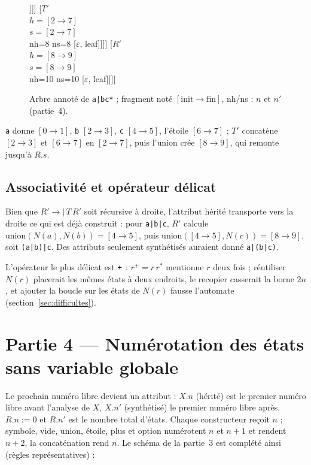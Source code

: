 \documentclass[12pt,a4paper]{article}
\newcommand{\code}[1]{{\fontsize{10}{12}\selectfont\texttt{#1}}}
\newcommand{\eps}{\ensuremath{\varepsilon}}
\newcommand{\fr}[2]{\ensuremath{[#1\to#2]}}
\newcommand{\tok}[1]{\ensuremath{\text{\fontsize{10}{12}\selectfont\ttfamily #1}}}
\begin{document}
\begin{figure}[H]
{\begin{forest}
              [*, leaf]
              [{$F'$\\ $h{=}\fr{6}{7}$\\ $s{=}\fr{6}{7}$\\ nh=8 ns=8} [\eps, leaf]]]]
          [{$T'$\\ $h{=}\fr{2}{7}$\\ $s{=}\fr{2}{7}$\\ nh=8 ns=8} [\eps, leaf]]]]
      [{$R'$\\ $h{=}\fr{8}{9}$\\ $s{=}\fr{8}{9}$\\ nh=10 ns=10} [\eps, leaf]]]]
\end{forest}}
\caption{Arbre annoté de \code{a|bc*} ; fragment noté $[\mathrm{init}\to\mathrm{fin}]$, nh/ns : $n$ et $n'$ (partie~4).}
\label{fig:arbre}
\end{figure}

\code{a} donne \fr01, \code{b} \fr23, \code{c} \fr45, l'étoile \fr67 ; $T'$ concatène \fr23 et
\fr67 en \fr27, puis l'union crée \fr89, qui remonte jusqu'à $R.s$.

\subsection{Associativité et opérateur délicat}

Bien que $R' \to \texttt{|}\,T\,R'$ soit récursive à droite, l'attribut hérité transporte vers la
droite ce qui est déjà construit : pour \code{a|b|c}, $R'$ calcule
$\mathrm{union}(N(a), N(b)) = \fr45$, puis $\mathrm{union}(\fr45, N(c)) = \fr89$, soit
\code{(a|b)|c}. Des attributs seulement synthétisés auraient donné \code{a|(b|c)}.

L'opérateur le plus délicat est \tok{+} : $r^+ = r\,r^*$ mentionne $r$ deux fois ; réutiliser
$N(r)$ placerait les mêmes états à deux endroits, le recopier casserait la borne $2n$, et ajouter
la boucle sur les états de $N(r)$ fausse l'automate (section~\ref{sec:difficultes}).

\section{Partie 4 --- Numérotation des états sans variable globale}\label{sec:partie4}

Le prochain numéro libre devient un attribut : $X.n$ (hérité) est le premier numéro libre avant
l'analyse de $X$, $X.n'$ (synthétisé) le premier numéro libre après. $R.n := 0$ et $R.n'$ est le
nombre total d'états. Chaque constructeur reçoit $n$ ; symbole, vide, union, étoile, plus et
option numérotent $n$ et $n+1$ et rendent $n+2$, la concaténation rend $n$. Le schéma de la
partie~3 est complété ainsi (règles représentatives) :
\end{document}
